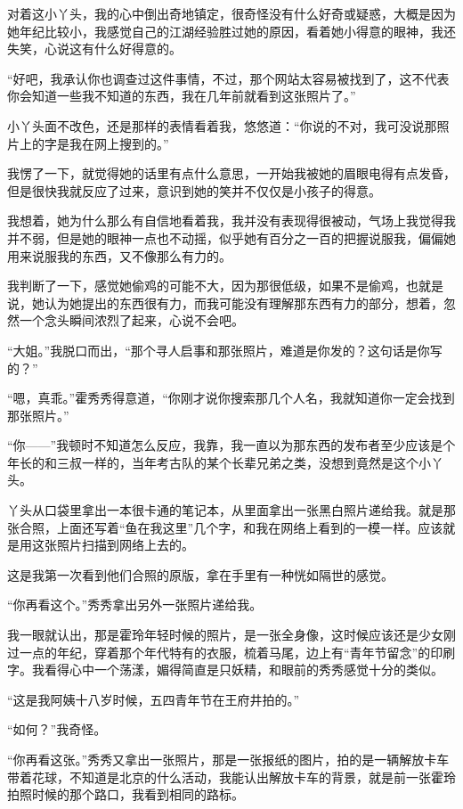 对着这小丫头，我的心中倒出奇地镇定，很奇怪没有什么好奇或疑惑，大概是因为她年纪比较小，我感觉自己的江湖经验胜过她的原因，看着她小得意的眼神，我还失笑，心说这有什么好得意的。

“好吧，我承认你也调查过这件事情，不过，那个网站太容易被找到了，这不代表你会知道一些我不知道的东西，我在几年前就看到这张照片了。”

小丫头面不改色，还是那样的表情看着我，悠悠道：“你说的不对，我可没说那照片上的字是我在网上搜到的。”

我愣了一下，就觉得她的话里有点什么意思，一开始我被她的眉眼电得有点发昏，但是很快我就反应了过来，意识到她的笑并不仅仅是小孩子的得意。

我想着，她为什么那么有自信地看着我，我并没有表现得很被动，气场上我觉得我并不弱，但是她的眼神一点也不动摇，似乎她有百分之一百的把握说服我，偏偏她用来说服我的东西，又不像那么有力的。

我判断了一下，感觉她偷鸡的可能不大，因为那很低级，如果不是偷鸡，也就是说，她认为她提出的东西很有力，而我可能没有理解那东西有力的部分，想着，忽然一个念头瞬间浓烈了起来，心说不会吧。

“大姐。”我脱口而出，“那个寻人启事和那张照片，难道是你发的？这句话是你写的？”

“嗯，真乖。”霍秀秀得意道，“你刚才说你搜索那几个人名，我就知道你一定会找到那张照片。”

“你——”我顿时不知道怎么反应，我靠，我一直以为那东西的发布者至少应该是个年长的和三叔一样的，当年考古队的某个长辈兄弟之类，没想到竟然是这个小丫头。

丫头从口袋里拿出一本很卡通的笔记本，从里面拿出一张黑白照片递给我。就是那张合照，上面还写着“鱼在我这里”几个字，和我在网络上看到的一模一样。应该就是用这张照片扫描到网络上去的。

这是我第一次看到他们合照的原版，拿在手里有一种恍如隔世的感觉。

“你再看这个。”秀秀拿出另外一张照片递给我。

我一眼就认出，那是霍玲年轻时候的照片，是一张全身像，这时候应该还是少女刚过一点的年纪，穿着那个年代特有的衣服，梳着马尾，边上有“青年节留念”的印刷字。我看得心中一个荡漾，媚得简直是只妖精，和眼前的秀秀感觉十分的类似。

“这是我阿姨十八岁时候，五四青年节在王府井拍的。”

“如何？”我奇怪。

“你再看这张。”秀秀又拿出一张照片，那是一张报纸的图片，拍的是一辆解放卡车带着花球，不知道是北京的什么活动，我能认出解放卡车的背景，就是前一张霍玲拍照时候的那个路口，我看到相同的路标。

